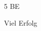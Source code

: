 \documentclass[a4paper,12pt]{article}
\begin{document}
\begin{flushright}5 BE \end{flushright}
\vspace{0,8cm}


\centerline{Viel Erfolg}









\end{document}
